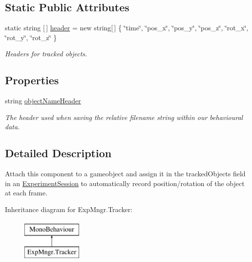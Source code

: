 \subsection*{Static Public Attributes}
\begin{DoxyCompactItemize}
\item 
static string \mbox{[}$\,$\mbox{]} \hyperlink{class_exp_mngr_1_1_tracker_ab05dfb3693984c0ce938f28efa067101}{header} = new string\mbox{[}$\,$\mbox{]} \{ \char`\"{}time\char`\"{}, \char`\"{}pos\+\_\+x\char`\"{}, \char`\"{}pos\+\_\+y\char`\"{}, \char`\"{}pos\+\_\+z\char`\"{}, \char`\"{}rot\+\_\+x\char`\"{}, \char`\"{}rot\+\_\+y\char`\"{}, \char`\"{}rot\+\_\+z\char`\"{} \}
\begin{DoxyCompactList}\small\item\em Headers for tracked objects. \end{DoxyCompactList}\end{DoxyCompactItemize}
\subsection*{Properties}
\begin{DoxyCompactItemize}
\item 
string \hyperlink{class_exp_mngr_1_1_tracker_a574d85b389ddeaf83ae7bf4233491a5b}{object\+Name\+Header}
\begin{DoxyCompactList}\small\item\em The header used when saving the relative filename string within our behavioural data. \end{DoxyCompactList}\end{DoxyCompactItemize}


\subsection{Detailed Description}
Attach this component to a gameobject and assign it in the tracked\+Objects field in an \hyperlink{class_exp_mngr_1_1_experiment_session}{Experiment\+Session} to automatically record position/rotation of the object at each frame. 

Inheritance diagram for Exp\+Mngr.\+Tracker\+:\begin{figure}[H]
\begin{center}
\leavevmode
\includegraphics[height=2.000000cm]{class_exp_mngr_1_1_tracker}
\end{center}
\end{figure}


